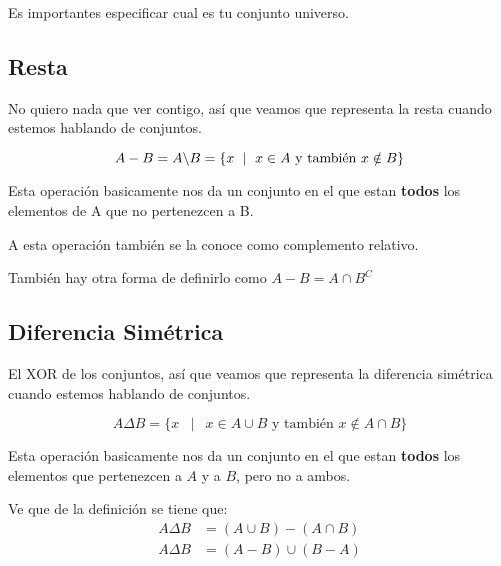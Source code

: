 \documentclass[12pt]{report}                                    %
\DeclareMathOperator \Space {\quad}                             %
\DeclareMathOperator \MiniSpace {\;}                            %
\newcommand \Such {\MiniSpace|\MiniSpace}                       %
\begin{document}
                Es importantes especificar cual es tu conjunto universo.


        \clearpage
        \subsection{Resta}

            No quiero nada que ver contigo, así que veamos que representa la resta cuando estemos
            hablando de conjuntos.

            \begin{equation}
                A - B = A \char`\\ B = \{ x \Such x \in A \text{ y también }  x \notin B \}
            \end{equation}

            Esta operación basicamente nos da un conjunto en el que estan \textbf{todos} los elementos
            de A que no pertenezcen a B.

            A esta operación también se la conoce como complemento relativo.

            También hay otra forma de definirlo como $A - B = A \cap B^C$



        \clearpage
        \subsection{Diferencia Simétrica}

            El XOR de los conjuntos, así que veamos que representa la diferencia simétrica cuando estemos
            hablando de conjuntos.

            \begin{equation}
                A \Delta B = \{ x \Such x \in A \cup B \text{ y también }  x \notin A \cap B \}
            \end{equation}

            Esta operación basicamente nos da un conjunto en el que estan \textbf{todos} los elementos
            que pertenezcen a $A$ y a $B$, pero no a ambos.

            Ve que de la definición se tiene que:
            \begin{equation*}
            \begin{split}
                A \Delta B &= (A \cup B) - ( A \cap B) \\
                A \Delta B &= (A - B) \cup ( B - A)
            \end{split}
            \end{equation*}
\end{document}
